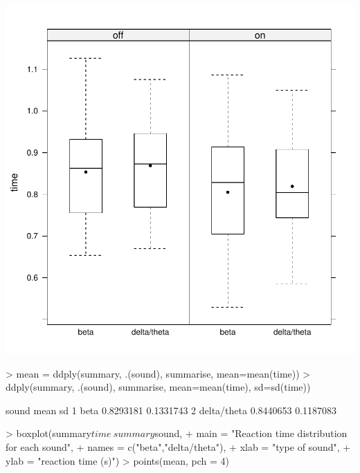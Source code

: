 \documentclass[12pt,a4paper]{article}
\begin{document}
\begin{itemize}
\begin{Schunk}
\begin{Sinput}
\end{Sinput}
\end{Schunk}
\includegraphics{report-009}
\begin{Schunk}
\begin{Sinput}
> mean = ddply(summary, .(sound), summarise, mean=mean(time))
> ddply(summary, .(sound), summarise, mean=mean(time), sd=sd(time))
\end{Sinput}
\begin{Soutput}
        sound      mean        sd
1        beta 0.8293181 0.1331743
2 delta/theta 0.8440653 0.1187083
\end{Soutput}
\begin{Sinput}
> boxplot(summary$time~summary$sound,
+ main = "Reaction time distribution for each sound",
+ names = c("beta","delta/theta"),
+ xlab = "type of sound",
+ ylab = "reaction time (s)")
> points(mean, pch = 4)
\end{Sinput}
\end{Schunk}

\end{itemize}
\end{document}
